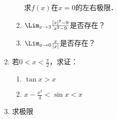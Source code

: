 \begin{ex}
\begin{enumerate}
\begin{enumerate}
    求$f(x)$在$x=0$的左右极限．

    \item $\Lim_{x\to 3}\frac{[x]^2-9}{x^2-9}$是否存在？
    \item $\Lim_{x\to 0}\frac{x}{|x|}$是否存在？
\end{enumerate}

\item 若$0<x<\frac{\pi}{2}$，求证：
\begin{multicols}{2}
    \begin{enumerate}
        \item $\tan x>x$
        \item $x-\frac{x^2}{4}<\sin x<x$
    \end{enumerate}
\end{multicols}

\item 求极限  
\begin{enumerate}
\end{enumerate}   

\end{enumerate}
\end{ex}

